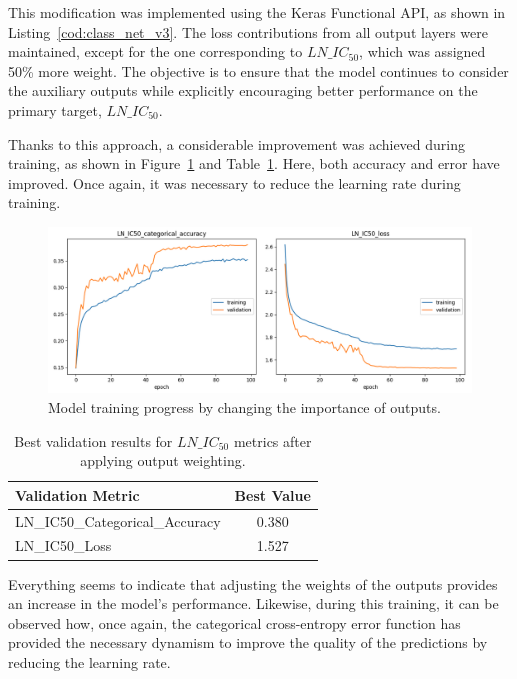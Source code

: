 This modification was implemented using the Keras Functional API, as shown in Listing~\ref{cod:class_net_v3}. The loss contributions from all output layers were maintained, except for the one corresponding to \(LN\_IC_{50}\), which was assigned 50\% more weight. The objective is to ensure that the model continues to consider the auxiliary outputs while explicitly encouraging better performance on the primary target, \(LN\_IC_{50}\).

Thanks to this approach, a considerable improvement was achieved during training, as shown in Figure~\ref{fig:train_class_net_v3} and Table~\ref{tab:best_val_ln_ic50_wheighting}. Here, both accuracy and error have improved. Once again, it was necessary to reduce the learning rate during training.

\begin{figure}[H]
    \centering
    \includegraphics[width=1\textwidth]{figures/neural_net_classification/classification_mse_v3.png}
    \caption{Model training progress by changing the importance of outputs.}
    \label{fig:train_class_net_v3}
\end{figure}

\begin{table}[H]
    \centering
    \begin{tabular}{|l|c|}
    \hline
    \textbf{Validation Metric} & \textbf{Best Value} \\
    \hline
    LN\_IC50\_Categorical\_Accuracy & 0.380 \\
    LN\_IC50\_Loss & 1.527 \\
    \hline
    \end{tabular}
    \caption{Best validation results for \(LN\_IC_{50}\) metrics after applying output weighting.}
    \label{tab:best_val_ln_ic50_wheighting}
\end{table}

Everything seems to indicate that adjusting the weights of the outputs provides an increase in the model's performance. Likewise, during this training, it can be observed how, once again, the categorical cross-entropy error function has provided the necessary dynamism to improve the quality of the predictions by reducing the learning rate.

